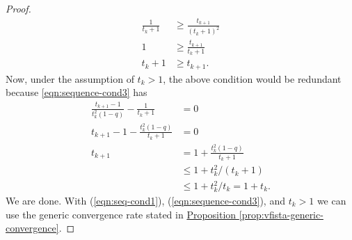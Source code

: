 \begin{proof}
\begin{align*}
            \frac{1}{t_k + 1} & \ge 
            \frac{t_{k + 1}}{(t_k + 1)^2}
            \\
            1 &\ge 
            \frac{t_{k + 1}}{t_k + 1}
            \\
            t_k + 1 &\ge t_{k + 1}. 
        \end{align*}
        Now, under the assumption of $t_k > 1$, the above condition would be redundant because \ref*{eqn:sequence-cond3} has 
        \begin{align*}
            \frac{t_{k + 1} - 1}{t_k^2(1 - q)}
            -
            \frac{1}{t_k + 1} &= 0
            \\
            t_{k + 1} - 1 - 
            \frac{t_k^2(1 - q)}{t_k + 1} &= 0
            \\
            t_{k + 1} &= 1 + 
            \frac{t_k^2(1 - q)}{t_k + 1}
            \\
            & \le 1 + t_k^2/(t_k + 1)
            \\
            &\le 1 + t_k^2/t_k = 1 + t_k. 
        \end{align*}
        We are done. 
        With (\ref*{eqn:seq-cond1}), (\ref*{eqn:sequence-cond3}), and $t_k > 1$ we can use the generic convergence rate stated in \hyperref[prop:vfista-generic-convergence]{Proposition \ref*{prop:vfista-generic-convergence}}. 
    \end{proof}
    


